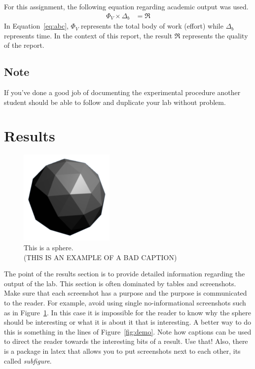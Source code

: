 \documentclass[onecolumn]{article}
\begin{document}
For this assignment, the following equation regarding academic output was used.
\begin{align}
	\Phi_V \times \Delta_b &= \Re \label{eq:abc}
\end{align}
In Equation~\ref{eq:abc}, $\Phi_V$ represents the total body of work (effort) while $\Delta_b$ represents time. In the context of this report, the result $\Re$ represents the quality of the report.

\subsection*{Note} %
If you've done a good job of documenting the experimental procedure another student should be able to follow and duplicate your lab without problem.

\section{Results}

\begin{figure}[t]
\centering
    \includegraphics[width=.3\linewidth]{fig/flat.png}
\caption{\label{fig:demo-bad}
This is a sphere.\\(THIS IS AN EXAMPLE OF A BAD CAPTION)}
\end{figure}

The point of the results section is to provide detailed information regarding the output of the lab. This section is often dominated by tables and screenshots. Make sure that each screenshot has a purpose and the purpose is communicated to the reader. For example, avoid using single no-informational screenshots such as in Figure~\ref{fig:demo-bad}. In this case it is impossible for the reader to know why the sphere should be interesting or what it is about it that is interesting. A better way to do this is something in the lines of Figure~\ref{fig:demo}. Note how captions can be used to direct the reader towards the interesting bits of a result. Use that! Also, there is a package in latex that allows you to put screenshots next to each other, its called \emph{subfigure}.
\end{document}
